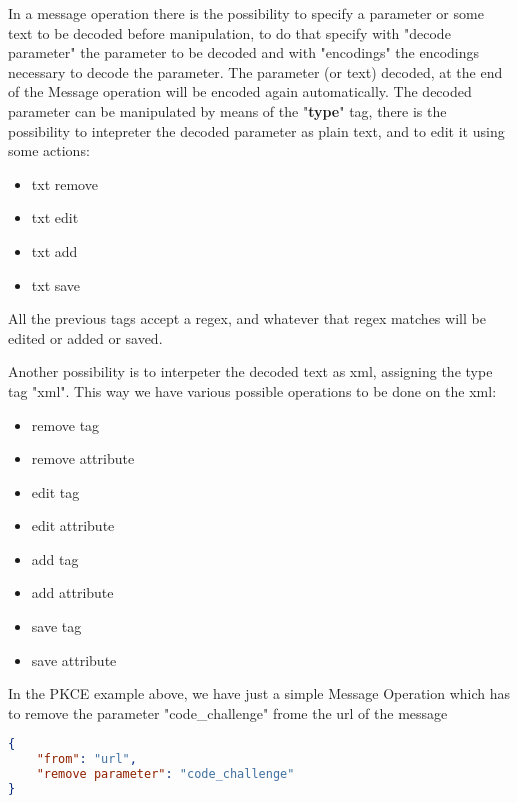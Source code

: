 In a message operation there is the possibility to specify a parameter or some text to be decoded before manipulation, to do that specify with "decode parameter" the parameter to be decoded and with "encodings" the encodings necessary to decode the parameter. The parameter (or text) decoded, at the end of the Message operation will be encoded again automatically.
The decoded parameter can be manipulated by means of the "\textbf{type}" tag, there is the possibility to intepreter the decoded parameter as plain text, and to edit it using some actions:
\begin{itemize}
    \item txt remove
    \item txt edit
    \item txt add
    \item txt save
\end{itemize}
All the previous tags accept a regex, and whatever that regex matches will be edited or added or saved.

Another possibility is to interpeter the decoded text as xml, assigning the type tag "xml".
This way we have various possible operations to be done on the xml:
\begin{itemize}
    \item remove tag
    \item remove attribute
    \item edit tag
    \item edit attribute
    \item add tag
    \item add attribute 
    \item save tag
    \item save attribute
\end{itemize}

In the PKCE example above, we have just a simple Message Operation which has to remove the parameter "code\_challenge" frome the url of the message
\begin{lstlisting}[language=json]
{
    "from": "url",
    "remove parameter": "code_challenge"
}
\end{lstlisting}

